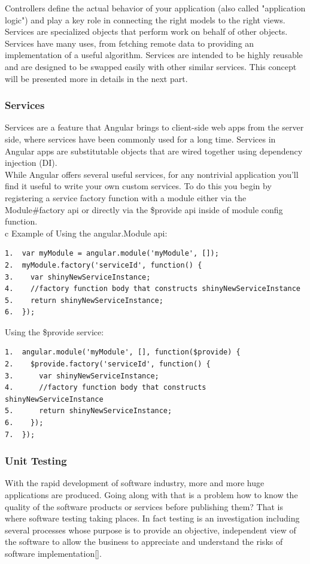 \documentclass[14pt,a4paper]{extreport}
\begin{document}
Controllers define the actual behavior of your application (also called "application logic") and play a key role in connecting the right models to the right views.
\\

Services are specialized objects that perform work on behalf of other objects. Services have many uses, from fetching remote data to providing an implementation of a useful algorithm. Services are intended to be highly reusable and are designed to be swapped easily with other similar services. This concept will be presented more in details in the next part.

			\subsubsection{Services}
			Services are a feature that Angular brings to client-side web apps from the server side, where services have been commonly used for a long time. Services in Angular apps are substitutable objects that are wired together using dependency injection (DI).
\\
			
While Angular offers several useful services, for any nontrivial application you'll find it useful to write your own custom services. To do this you begin by registering a service factory function with a module either via the Module\#factory api or directly via the \$provide api inside of module config function.
\\
c
Example of Using the angular.Module api:
\begin{verbatim}
1.	var myModule = angular.module('myModule', []);
2.	myModule.factory('serviceId', function() {
3.	  var shinyNewServiceInstance;
4.	  //factory function body that constructs shinyNewServiceInstance
5.	  return shinyNewServiceInstance;
6.	});
\end{verbatim}
Using the \$provide service:
\begin{verbatim}
1.	angular.module('myModule', [], function($provide) {
2.	  $provide.factory('serviceId', function() {
3.	    var shinyNewServiceInstance;
4.	    //factory function body that constructs shinyNewServiceInstance
5.	    return shinyNewServiceInstance;
6.	  });
7.	});
\end{verbatim}


			\subsubsection{Unit Testing}
			With the rapid development of software industry, more and more huge applications are produced. Going along with that is a problem how to know the quality of the software products or services before publishing them? That is where software testing taking places. In fact testing is an investigation including several processes whose purpose is to provide an objective, independent view of the software to allow the business to appreciate and understand the risks of software implementation[].
\\
\end{document}
